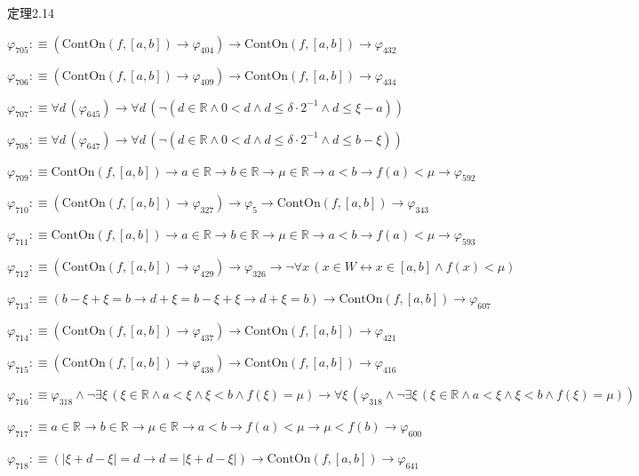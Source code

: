 \begin{fullproof}{定理2.14}
\begin{abbrevlist}
\item $\varphi_{705} :\equiv (\mathrm{ContOn}(f,[a,b]) \to \varphi_{404}) \to \mathrm{ContOn}(f,[a,b]) \to \varphi_{432}$
\item $\varphi_{706} :\equiv (\mathrm{ContOn}(f,[a,b]) \to \varphi_{409}) \to \mathrm{ContOn}(f,[a,b]) \to \varphi_{434}$
\item $\varphi_{707} :\equiv \forall d\,(\varphi_{645}) \to \forall d\,(\neg (d \in \mathbb{R} \land 0 < d \land d \leq \delta \cdot 2^{-1} \land d \leq \xi - a))$
\item $\varphi_{708} :\equiv \forall d\,(\varphi_{647}) \to \forall d\,(\neg (d \in \mathbb{R} \land 0 < d \land d \leq \delta \cdot 2^{-1} \land d \leq b - \xi))$
\item $\varphi_{709} :\equiv \mathrm{ContOn}(f,[a,b]) \to a \in \mathbb{R} \to b \in \mathbb{R} \to \mu \in \mathbb{R} \to a < b \to f(a) < \mu \to \varphi_{592}$
\item $\varphi_{710} :\equiv (\mathrm{ContOn}(f,[a,b]) \to \varphi_{327}) \to \varphi_{5} \to \mathrm{ContOn}(f,[a,b]) \to \varphi_{343}$
\item $\varphi_{711} :\equiv \mathrm{ContOn}(f,[a,b]) \to a \in \mathbb{R} \to b \in \mathbb{R} \to \mu \in \mathbb{R} \to a < b \to f(a) < \mu \to \varphi_{593}$
\item $\varphi_{712} :\equiv (\mathrm{ContOn}(f,[a,b]) \to \varphi_{429}) \to \varphi_{326} \to \neg \forall x\,(x \in W \leftrightarrow x \in [a,b] \land f(x) < \mu)$
\item $\varphi_{713} :\equiv (b - \xi + \xi = b \to d + \xi = b - \xi + \xi \to d + \xi = b) \to \mathrm{ContOn}(f,[a,b]) \to \varphi_{607}$
\item $\varphi_{714} :\equiv (\mathrm{ContOn}(f,[a,b]) \to \varphi_{437}) \to \mathrm{ContOn}(f,[a,b]) \to \varphi_{421}$
\item $\varphi_{715} :\equiv (\mathrm{ContOn}(f,[a,b]) \to \varphi_{438}) \to \mathrm{ContOn}(f,[a,b]) \to \varphi_{416}$
\item $\varphi_{716} :\equiv \varphi_{318} \land \neg \exists \xi\,(\xi \in \mathbb{R} \land a < \xi \land \xi < b \land f(\xi) = \mu) \to \forall \xi\,(\varphi_{318} \land \neg \exists \xi\,(\xi \in \mathbb{R} \land a < \xi \land \xi < b \land f(\xi) = \mu))$
\item $\varphi_{717} :\equiv a \in \mathbb{R} \to b \in \mathbb{R} \to \mu \in \mathbb{R} \to a < b \to f(a) < \mu \to \mu < f(b) \to \varphi_{600}$
\item $\varphi_{718} :\equiv (\lvert \xi + d - \xi \rvert = d \to d = \lvert \xi + d - \xi \rvert) \to \mathrm{ContOn}(f,[a,b]) \to \varphi_{641}$

\end{abbrevlist}
\end{fullproof}
